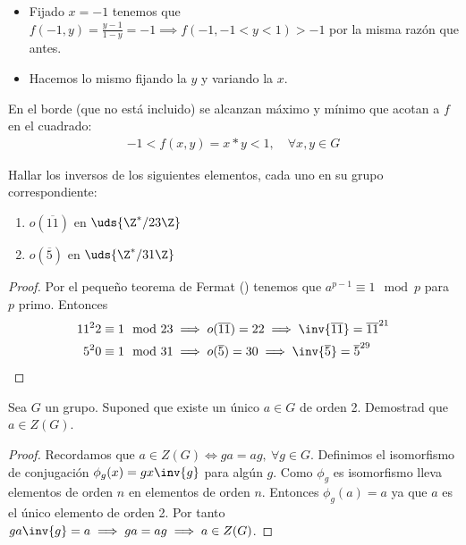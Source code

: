 \begin{ex}[H1.2]
\begin{itemize}
\begin{itemize}
			\item Fijado $x = -1$ tenemos que $f(-1, y) = \frac{y-1}{1-y} = -1 \implies f(-1, -1 < y < 1) > -1$ por la misma razón que antes.
			\item Hacemos lo mismo fijando la $y$ y variando la $x$.
		\end{itemize}
		En el borde (que no está incluido) se alcanzan máximo y mínimo que acotan a $f$ en el cuadrado:
		\begin{align*}
			-1 < f(x,y) = x \ast y < 1,\quad \forall x, y \in G
		\end{align*}
	\end{itemize}
\end{ex}

\begin{ex}[H1.3]Hallar los inversos de los siguientes elementos, cada uno en su grupo correspondiente:
	\begin{enumerate}
		\item $o(\overline{11})$ en $\uds{\Z^\ast/23\Z}$
		\item $o(\overline{5})$ en $\uds{\Z^\ast/31\Z}$
	\end{enumerate}
\end{ex}

\begin{proof}
	Por el pequeño teorema de Fermat (\cite{flt}) tenemos que $a^{p-1} \equiv 1 \mod p$ para $p$ primo. Entonces
	\begin{align*}
		11^22 \equiv 1 \mod 23 &\implies o(\overline{11}) = 22 \implies \inv{\overline{11}} = \overline{11}^{21} \\
		5^20 \equiv 1 \mod 31 &\implies o(\overline{5}) = 30 \implies \inv{\overline{5}} = \overline{5}^{29}
	\end{align*}
\end{proof}

\begin{ex}[H1.33]
	\label{ex:h1.33}
	Sea $G$ un grupo. Suponed que existe un único $a \in G$ de orden 2. Demostrad que $a \in Z(G)$.
\end{ex}

\begin{proof}
	Recordamos que $a \in Z(G) \iff ga = ag,\ \forall g \in G$. Definimos el isomorfismo de conjugación $\phi_g (x) = gx\inv{g}$ para algún $g$. Como $\phi_g$ es isomorfismo lleva elementos de orden $n$ en elementos de orden $n$. Entonces $\phi_g(a) = a$ ya que $a$ es el único elemento de orden 2. Por tanto $ga\inv{g} = a \implies ga = ag \implies a \in Z(G)$.
\end{proof}


